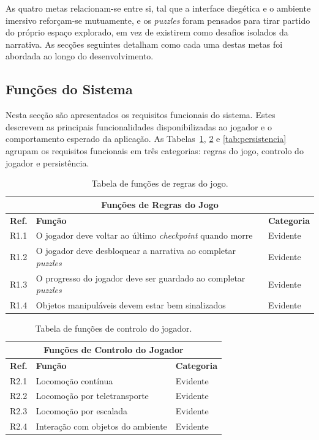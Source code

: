\documentclass[a4paper, 12pt]{book}
\begin{document}
As quatro metas relacionam-se entre si, tal que a interface diegética e o ambiente 
imersivo reforçam-se mutuamente, e os \textit{puzzles} foram pensados para tirar 
partido do próprio espaço explorado, em vez de existirem como desafios 
isolados da narrativa. As secções seguintes detalham como cada uma destas 
metas foi abordada ao longo do desenvolvimento.
\subsection{Funções do Sistema}\label{ssec:funcoes}
Nesta secção são apresentados os requisitos funcionais do sistema. Estes
descrevem as principais funcionalidades disponibilizadas ao jogador e o
comportamento esperado da aplicação. As Tabelas~\ref{tab:regras_jogo}, 
\ref{tab:controlo_jogador} e \ref{tab:persistencia} agrupam os requisitos funcionais em
três categorias: regras do jogo, controlo do jogador e persistência.
\begin{table}[H]
    \centering
    \begin{tabular}{|l|p{9cm}|l|}
        \hline
        \multicolumn{3}{|c|}{\textbf{Funções de Regras do Jogo}} \\ \hline
        \textbf{Ref.} & \textbf{Função} & \textbf{Categoria} \\ \hline
        R1.1 & O jogador deve voltar ao último \textit{checkpoint} quando morre & Evidente \\ \hline
        R1.2 & O jogador deve desbloquear a narrativa ao completar \textit{puzzles} & Evidente \\ \hline
        R1.3 & O progresso do jogador deve ser guardado ao completar \textit{puzzles} & Evidente \\ \hline
        R1.4 & Objetos manipuláveis devem estar bem sinalizados & Evidente \\ \hline
    \end{tabular}
    \caption{Tabela de funções de regras do jogo.}
    \label{tab:regras_jogo}
\end{table}


\begin{table}[H]
    \centering
    \begin{tabular}{|l|p{9cm}|l|}
        \hline
        \multicolumn{3}{|c|}{\textbf{Funções de Controlo do Jogador}} \\ \hline
        \textbf{Ref.} & \textbf{Função} & \textbf{Categoria} \\ \hline
        R2.1 & Locomoção contínua & Evidente \\ \hline
        R2.2 & Locomoção por teletransporte & Evidente \\ \hline
        R2.3 & Locomoção por escalada & Evidente \\ \hline
        R2.4 & Interação com objetos do ambiente & Evidente \\ \hline
    \end{tabular}
    \caption{Tabela de funções de controlo do jogador.}
    \label{tab:controlo_jogador}
\end{table}
\end{document}
